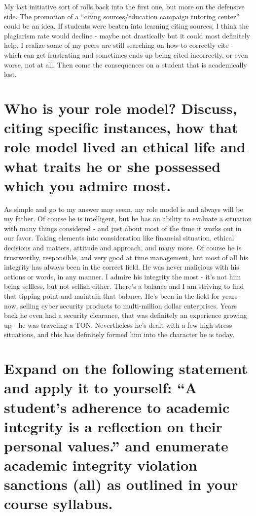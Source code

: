 \documentclass[12pt]{article} %
\begin{document}
My last initiative sort of rolls back into the first one, but more on the defensive side. The promotion of a “citing sources/education campaign tutoring center” could be an idea. If students were beaten into learning citing sources, I think the plagiarism rate would decline - maybe not drastically but it could most definitely help. I realize some of my peers are still searching on how to correctly cite - which can get frustrating and sometimes ends up being cited incorrectly, or even worse, not at all. Then come the consequences on a student that is academically lost. 


\section{Who is your role model? Discuss, citing specific instances, how that role model lived an ethical life and what traits he or she possessed which you admire most. }

\tab
As simple and go to my answer may seem, my role model is and always will be my father. Of course he is intelligent, but he has an ability to evaluate a situation with many things considered - and just about most of the time it works out in our favor. Taking elements into consideration like financial situation, ethical decisions and matters, attitude and approach, and many more. Of course he is trustworthy, responsible, and very good at time management, but most of all his integrity has always been in the correct field. He was never malicious with his actions or words, in any manner.  I admire his integrity the most - it’s not him being selfless, but not selfish either. There’s a balance and I am striving to find that tipping point and maintain that balance. He’s been in the field for years now, selling cyber security products to multi-million dollar enterprises. Years back he even had a security clearance, that was definitely an experience growing up - he was traveling a TON. Nevertheless he’s dealt with a few high-stress situations, and this has definitely formed him into the character he is today.

\section{Expand on the following statement and apply it to yourself: “A student’s adherence to academic integrity is a reflection on their personal values.” and enumerate academic integrity violation sanctions (all) as outlined in your course syllabus.}
\end{document}
